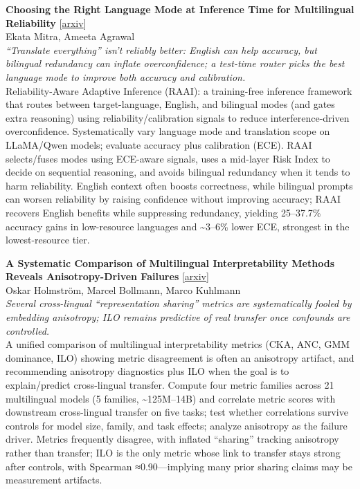 \documentclass[12pt,letterpaper]{article}
\begin{document}
\medskip

{\small\textbf{Choosing the Right Language Mode at Inference Time for Multilingual Reliability}} {\scriptsize[\href{https://arxiv.org/abs/2609.04653}{arxiv}]}\\
{\scriptsize Ekata Mitra, Ameeta Agrawal}\\

{\small\textit{``Translate everything'' isn't reliably better: English can help accuracy, but bilingual redundancy can inflate overconfidence; a test-time router picks the best language mode to improve both accuracy and calibration.}}\\[1pt]
{\footnotesize Reliability-Aware Adaptive Inference (RAAI): a training-free inference framework that routes between target-language, English, and bilingual modes (and gates extra reasoning) using reliability/calibration signals to reduce interference-driven overconfidence. Systematically vary language mode and translation scope on LLaMA/Qwen models; evaluate accuracy plus calibration (ECE). RAAI selects/fuses modes using ECE-aware signals, uses a mid-layer Risk Index to decide on sequential reasoning, and avoids bilingual redundancy when it tends to harm reliability. English context often boosts correctness, while bilingual prompts can worsen reliability by raising confidence without improving accuracy; RAAI recovers English benefits while suppressing redundancy, yielding 25--37.7\% accuracy gains in low-resource languages and \textasciitilde{}3--6\% lower ECE, strongest in the lowest-resource tier.}

\medskip

{\small\textbf{A Systematic Comparison of Multilingual Interpretability Methods Reveals Anisotropy-Driven Failures}} {\scriptsize[\href{https://arxiv.org/abs/2609.04819}{arxiv}]}\\
{\scriptsize Oskar Holmstr\"om, Marcel Bollmann, Marco Kuhlmann}\\

{\small\textit{Several cross-lingual ``representation sharing'' metrics are systematically fooled by embedding anisotropy; ILO remains predictive of real transfer once confounds are controlled.}}\\[1pt]
{\footnotesize A unified comparison of multilingual interpretability metrics (CKA, ANC, GMM dominance, ILO) showing metric disagreement is often an anisotropy artifact, and recommending anisotropy diagnostics plus ILO when the goal is to explain/predict cross-lingual transfer. Compute four metric families across 21 multilingual models (5 families, \textasciitilde{}125M--14B) and correlate metric scores with downstream cross-lingual transfer on five tasks; test whether correlations survive controls for model size, family, and task effects; analyze anisotropy as the failure driver. Metrics frequently disagree, with inflated ``sharing'' tracking anisotropy rather than transfer; ILO is the only metric whose link to transfer stays strong after controls, with Spearman ≈0.90---implying many prior sharing claims may be measurement artifacts.}
\end{document}
